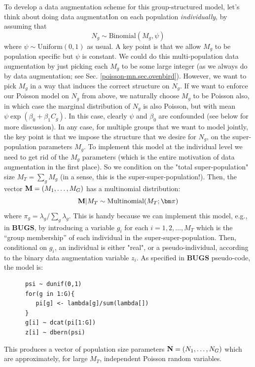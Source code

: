 To develop a data augmentation scheme for this group-structured model,
let's think about doing data augmentatIon on each population {\it
  individually}, by assuming that
\[
 N_{g} \sim \mbox{Binomial}(M_{g} , \psi)
\]
where $\psi \sim \mbox{Uniform}(0,1)$ as usual.  A key point is that
we allow $M_{g}$ to be population specific but $\psi$ is constant.  We
could do this multi-population data augmentation by just picking each
$M_{g}$ to be some large integer (as we always do by data
augmentation; see Sec. \ref{poisson-mn.sec.ovenbird}). However, we
want to pick $M_{g}$ in a way that induces
the correct structure on
$N_{g}$. If we want to enforce our Poisson model on $N_{g}$ from
above, we naturally choose $M_{g}$ to be Poisson also, in which case
the marginal distribution of $N_{g}$ is also Poisson, but with mean
$\psi \exp(\beta_{0} + \beta_{1}C_{g})$.  In this case, clearly $\psi$ and
$\beta_{0}$ are confounded (see below for more discussion).
In any case, for multiple groups that we want to model jointly, the
key point is that we
 impose the structure that we desire for $N_{g}$, on the
super-population parameters $M_{g}$.  To implement this model at the
individual level we need to get rid of the $M_{g}$ parameters (which
is the entire motivation of data augmentation in the first place). So
we condition on the "total super-population" size $M_{T}= \sum_{g}
M_{g}$ (in a sense, this is the super-super-population!). Then, the vector ${\bf M} = (M_{1},\ldots,M_{G})$ has a
multinomial distribution:
\begin{equation}
{\bf M}|M_{T} \sim \mbox{Multinomial}(M_{T};  {\bm \pi} )
\label{eq.mn1}
\end{equation}
where
$\pi_{g} = \lambda_{g}/\sum_{g} \lambda_{g}$.  This is handy because
we can implement this model, e.g., in {\bf BUGS}, by introducing a
variable $g_{i}$ for each $i=1,2,\ldots, M_{T}$ which is the ``group
membership'' of each individual in the super-super-population.  Then,
conditional on $g_{i}$, an individual is either "real", or a
pseudo-individual, according to the binary data augmentation variable
$z_{i}$.  As specified in {\bf BUGS} pseudo-code, the
model is:
\begin{verbatim}
      psi ~ dunif(0,1)
      for(g in 1:G){
         pi[g] <- lambda[g]/sum(lambda[])
      }
      g[i] ~ dcat(pi[1:G])
      z[i] ~ dbern(psi)
\end{verbatim}
This produces a vector of population size parameters ${\bf N} =
(N_{1},\ldots,N_{G})$ which are approximately, for large $M_{T}$,
independent Poisson random variables.

